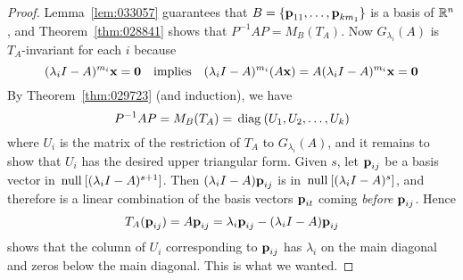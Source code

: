 \begin{proof}
Lemma~\ref{lem:033057} guarantees that $B = \{\textbf{p}_{11}, \dots, \textbf{p}_{km_1}\}$ is a basis of $\mathbb{R}^n$, and Theorem~\ref{thm:028841} shows that $P^{-1}AP = M_{B}(T_{A})$. Now $G_{\lambda_i}(A)$ is $T_{A}$-invariant for each $i$ because
\begin{equation*}
(\lambda_{i}I - A)^{m_i}\textbf{x} = \textbf{0} \quad \mbox{implies} \quad (\lambda_{i}I - A)^{m_i}(A\textbf{x}) = A(\lambda_{i}I - A)^{m_i}\textbf{x} = \textbf{0}
\end{equation*}
By Theorem~\ref{thm:029723} (and induction), we have
\begin{equation*}
P^{-1}AP = M_B(T_A) = \thinspace\operatorname{diag\medspace}(U_1, U_2, \dots, U_k)
\end{equation*}
where $U_{i}$ is the matrix of the restriction of $T_{A}$ to $G_{\lambda_i}(A)$, and it remains to show that $U_{i}$ has the desired upper triangular form. Given $s$, let $\textbf{p}_{ij}$ be a basis vector in $\thinspace\operatorname{null\medspace}[(\lambda_{i}I - A)^{s+1}]$. Then $(\lambda_{i}I - A)\textbf{p}_{ij}$ is in $\thinspace\operatorname{null\medspace}[(\lambda_{i}I - A)^{s}]$, and therefore is a linear combination of the basis vectors $\textbf{p}_{it}$ coming \textit{before} $\textbf{p}_{ij}$. Hence
\begin{equation*}
T_A(\textbf{p}_{ij}) = A\textbf{p}_{ij} = \lambda_{i}\textbf{p}_{ij} - (\lambda_{i}I - A)\textbf{p}_{ij}
\end{equation*}
shows that the column of $U_{i}$ corresponding to $\textbf{p}_{ij}$ has $\lambda_{i}$ on the main diagonal and zeros below the main diagonal. This is what we wanted.
\end{proof}

